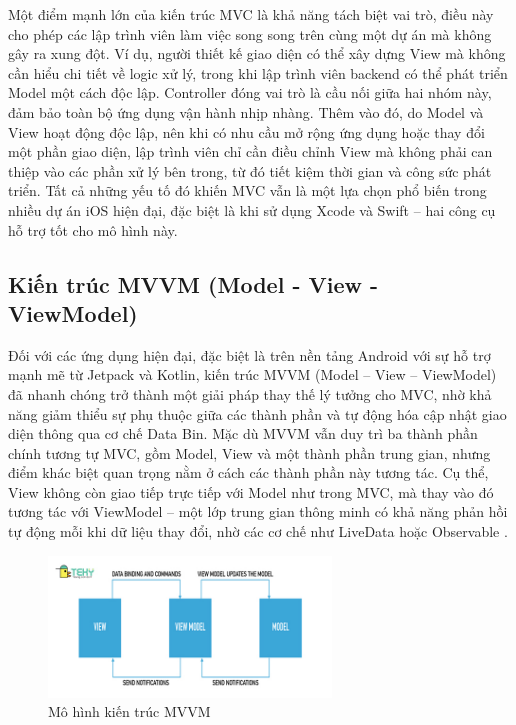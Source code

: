     \begin{flushleft}
      \hspace*{0.8cm}Một điểm mạnh lớn của kiến trúc MVC là khả năng tách biệt vai trò, điều này cho phép các lập trình viên làm việc song song trên cùng một dự án mà không gây ra xung đột. Ví dụ, người thiết kế giao diện có thể xây dựng View mà không cần hiểu chi tiết về logic xử lý, trong khi lập trình viên backend có thể phát triển Model một cách độc lập. Controller đóng vai trò là cầu nối giữa hai nhóm này, đảm bảo toàn bộ ứng dụng vận hành nhịp nhàng. Thêm vào đó, do Model và View hoạt động độc lập, nên khi có nhu cầu mở rộng ứng dụng hoặc thay đổi một phần giao diện, lập trình viên chỉ cần điều chỉnh View mà không phải can thiệp vào các phần xử lý bên trong, từ đó tiết kiệm thời gian và công sức phát triển. Tất cả những yếu tố đó khiến MVC vẫn là một lựa chọn phổ biến trong nhiều dự án iOS hiện đại, đặc biệt là khi sử dụng Xcode và Swift – hai công cụ hỗ trợ tốt cho mô hình này.
    \end{flushleft}

\subsection{Kiến trúc MVVM (Model - View - ViewModel)}
\renewcommand{\labelitemi}{--}    
    \begin{flushleft}
        \hspace*{0.8cm}Đối với các ứng dụng hiện đại, đặc biệt là trên nền tảng Android với sự hỗ trợ mạnh mẽ từ Jetpack và Kotlin, kiến trúc MVVM (Model – View – ViewModel) đã nhanh chóng trở thành một giải pháp thay thế lý tưởng cho MVC, nhờ khả năng giảm thiểu sự phụ thuộc giữa các thành phần và tự động hóa cập nhật giao diện thông qua cơ chế Data Bin. Mặc dù MVVM vẫn duy trì ba thành phần chính tương tự MVC, gồm Model, View và một thành phần trung gian, nhưng điểm khác biệt quan trọng nằm ở cách các thành phần này tương tác. Cụ thể, View không còn giao tiếp trực tiếp với Model như trong MVC, mà thay vào đó tương tác với ViewModel – một lớp trung gian thông minh có khả năng phản hồi tự động mỗi khi dữ liệu thay đổi, nhờ các cơ chế như LiveData hoặc Observable \cite{livedata-observable}.
    \end{flushleft}

\begin{figure}[h]
  \centering
  \includegraphics[width=0.67\textwidth]{images/mvvm.jpg}
  \caption{Mô hình kiến trúc MVVM}
  \label{fig:fig13}
\end{figure}

